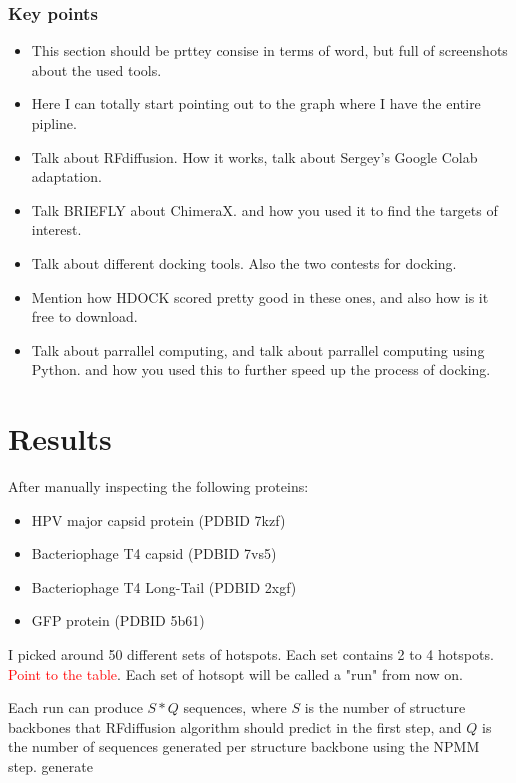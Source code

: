 \documentclass[11pt,a4paper]{article}
\begin{document}
\subsubsection{Key points}

\begin{itemize}
    \item This section should be prttey consise in terms of word, but 
    full of screenshots about the used tools.
    \item Here I can totally start pointing out to the graph where I 
    have the entire pipline.
    \item Talk about RFdiffusion. How it works, talk about Sergey's 
    Google Colab adaptation.
    \item Talk BRIEFLY about ChimeraX. and how you used it to find the 
    targets of interest.
    \item Talk about different docking tools. Also the two contests for 
    docking.
    \item Mention how HDOCK scored pretty good in these ones, and also 
    how is it free to download.
    \item Talk about parrallel computing, and talk about parrallel 
    computing using Python. and how you used this to further speed up 
    the process of docking.
\end{itemize}


\section{Results}

After manually inspecting the following proteins:

\begin{itemize}
    \item HPV major capsid protein (PDBID 7kzf)
    \item Bacteriophage T4 capsid (PDBID 7vs5)
    \item Bacteriophage T4 Long-Tail (PDBID 2xgf)
    \item GFP protein (PDBID 5b61)
\end{itemize}

I picked around 50 different sets of hotspots. Each set contains 2 to 4 hotspots. \textcolor{red}{Point to the table}. Each set of hotsopt will be called a "run" from now on.

Each run can produce $S*Q$ sequences, where $S$ is the number of structure backbones that RFdiffusion algorithm should predict in the first step, and $Q$ is the number of sequences generated per structure backbone using the NPMM step.
generate
\end{document}
